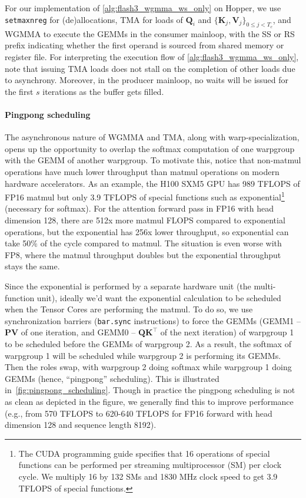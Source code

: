 For our implementation of \cref{alg:flash3_wgmma_ws_only} on Hopper, we use \verb|setmaxnreg| for (de)allocations, TMA for loads of $\mathbf{Q}_i$ and $\{ \mathbf{K}_j, \mathbf{V}_j \}_{0 \leq j < T_c}$, and WGMMA to execute the GEMMs in the consumer mainloop, with the SS or RS prefix indicating whether the first operand is sourced from shared memory or register file. For interpreting the execution flow of \cref{alg:flash3_wgmma_ws_only}, note that issuing TMA loads does not stall on the completion of other loads due to asynchrony. Moreover, in the producer mainloop, no waits will be issued for the first $s$ iterations as the buffer gets filled.

\paragraph{Pingpong scheduling} The asynchronous nature of WGMMA and TMA, along with warp-specialization, opens up the opportunity to overlap the softmax computation of one warpgroup with the GEMM of another warpgroup. To motivate this, notice that non-matmul operations have much lower throughput than matmul operations on modern hardware accelerators. As an example, the H100 SXM5 GPU has 989 TFLOPS of FP16 matmul but only 3.9 TFLOPS of special functions such as exponential\footnote{The CUDA programming guide specifies that 16 operations of special functions can be performed per streaming multiprocessor (SM) per clock cycle. We multiply 16 by 132 SMs and 1830 MHz clock speed to get 3.9 TFLOPS of special functions.} (necessary for softmax). For the attention forward pass in FP16 with head dimension 128, there are 512x more matmul FLOPS compared to exponential operations, but the exponential has 256x lower throughput, so exponential can take 50\% of the cycle compared to matmul. The situation is even worse with FP8, where the matmul throughput doubles but the exponential throughput stays the same.

Since the exponential is performed by a separate hardware unit (the multi-function unit), ideally we'd want the exponential calculation to be scheduled when the Tensor Cores are performing the matmul. To do so, we use synchronization barriers (\texttt{bar.sync} instructions) to force the GEMMs (GEMM1 -- $\mathbf{P} \mathbf{V}$ of one iteration, and GEMM0 -- $\mathbf{Q} \mathbf{K}^\top$
of the next iteration) of warpgroup 1 to be scheduled before the GEMMs of warpgroup 2. As a result, the softmax of warpgroup 1 will be scheduled while warpgroup 2 is performing its GEMMs. Then the roles swap, with warpgroup 2 doing softmax while warpgroup 1 doing GEMMs (hence, ``pingpong'' scheduling). This is illustrated in~\cref{fig:pingpong_scheduling}.
Though in practice the pingpong scheduling is not as clean as depicted in the figure, we generally find this to improve performance (e.g., from 570 TFLOPS to 620-640 TFLOPS for FP16 forward with head dimension 128 and sequence length 8192).


